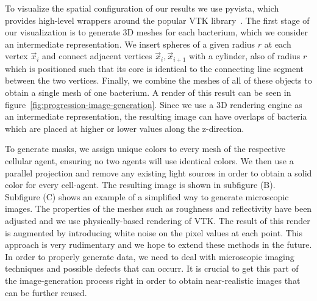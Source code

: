 \documentclass{article}
\begin{document}
To visualize the spatial configuration of our results we use pyvista, which provides high-level
wrappers around the popular VTK library~\cite{vtkBook,Sullivan2019}.
The first stage of our visualization is to generate 3D meshes for each bacterium, which we consider
an intermediate representation.
We insert spheres of a given radius $r$ at each vertex $\vec{x}_i$ and connect adjacent vertices
$\vec{x}_i,\vec{x}_{i+1}$ with a cylinder, also of radius $r$ which is positioned such that its core
is identical to the connecting line segment between the two vertices.
Finally, we combine the meshes of all of these objects to obtain a single mesh of one bacterium.
A render of this result can be seen in figure~\ref{fig:progression-image-generation}.
Since we use a 3D rendering engine as an intermediate representation, the resulting image can have
overlaps of bacteria which are placed at higher or lower values along the z-direction.

To generate masks, we assign unique colors to every mesh of the respective cellular agent, ensuring
no two agents will use identical colors.
We then use a parallel projection and remove any existing light sources in order to obtain a solid
color for every cell-agent.
The resulting image is shown in subfigure (B).
Subfigure (C) shows an example of a simplified way to generate microscopic images.
The properties of the meshes such as roughness and reflectivity have been adjusted and we use
physically-based rendering of VTK.
The result of this render is augmented by introducing white noise on the pixel values at each point.
This approach is very rudimentary and we hope to extend these methods in the future.
In order to properly generate data, we need to deal with microscopic imaging techniques and possible
defects that can occurr.
It is crucial to get this part of the image-generation process right in order to obtain
near-realistic images that can be further reused.
\end{document}

